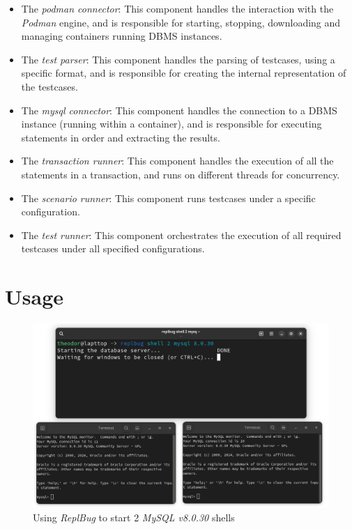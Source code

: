 \begin{itemize}
    \item The \textit{podman connector}: This component handles the interaction with the \textit{Podman} engine, and is responsible for starting, stopping, downloading and managing containers running DBMS instances.
    \item The \textit{test parser}: This component handles the parsing of testcases, using a specific format, and is responsible for creating the internal representation of the testcases.
    \item The \textit{mysql connector}: This component handles the connection to a DBMS instance (running within a container), and is responsible for executing statements in order and extracting the results.
    \item The \textit{transaction runner}: This component handles the execution of all the statements in a transaction, and runs on different threads for concurrency.
    \item The \textit{scenario runner}: This component runs testcases under a specific configuration.
    \item The \textit{test runner}: This component orchestrates the execution of all required testcases under all specified configurations. 
\end{itemize}


\section{Usage}



\begin{figure}
    \centering
    \includegraphics[width=\linewidth]{assets/replbug_shell.png}
    \caption{Using \textit{ReplBug} to start 2 \textit{MySQL v8.0.30} shells}
    \label{fig:replb_shell}
\end{figure}


